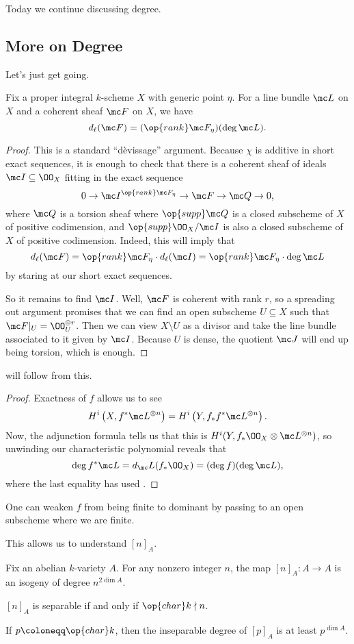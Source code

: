 \documentclass[../notes.tex]{subfiles}
\begin{document}
Today we continue discussing degree.

\subsection{More on Degree}
Let's just get going.
\begin{lemma} \label{lem:deg-by-rank}
	Fix a proper integral $k$-scheme $X$ with generic point $\eta$. For a line bundle $\mc L$ on $X$ and a coherent sheaf $\mc F$ on $X$, we have
	\[d_\ell(\mc F)=(\op{rank}\mc F_\eta)(\deg\mc L).\]
\end{lemma}
\begin{proof}
	This is a standard ``d\`evissage'' argument. Because $\chi$ is additive in short exact sequences, it is enough to check that there is a coherent sheaf of ideals $\mc I\subseteq\OO_X$ fitting in the exact sequence
	\[0\to\mc I^{\op{rank}\mc F_\eta}\to\mc F\to\mc Q\to0,\]
	where $\mc Q$ is a torsion sheaf where $\op{supp}\mc Q$ is a closed subscheme of $X$ of positive codimension, and $\op{supp}\OO_X/\mc I$ is also a closed subscheme of $X$ of positive codimension. Indeed, this will imply that
	\[d_\ell(\mc F)=\op{rank}\mc F_\eta\cdot d_\ell(\mc I)=\op{rank}\mc F_\eta\cdot\deg\mc L\]
	by staring at our short exact sequences.

	So it remains to find $\mc I$. Well, $\mc F$ is coherent with rank $r$, so a spreading out argument promises that we can find an open subscheme $U\subseteq X$ such that $\mc F|_U=\OO_U^{\oplus r}$. Then we can view $X\setminus U$ as a divisor and take the line bundle associated to it given by $\mc I$. Because $U$ is dense, the quotient $\mc J$ will end up being torsion, which is enough.
\end{proof}
 will follow from this.
\degpullback*
\begin{proof}
	Exactness of $f$ allows us to see
	\[H^i\left(X,f^*\mc L^{\otimes n}\right)=H^i\left(Y,f_*f^*\mc L^{\otimes n}\right).\]
	Now, the adjunction formula tells us that this is $H^i(Y,f_*\OO_X\otimes\mc L^{\otimes n})$, so unwinding our characteristic polynomial reveals that
	\[\deg f^*\mc L=d_\mc L(f_*\OO_X)=(\deg f)(\deg\mc L),\]
	where the last equality has used .
\end{proof}
\begin{remark}
	One can weaken $f$ from being finite to dominant by passing to an open subscheme where we are finite.
\end{remark}
This allows us to understand $[n]_A$.
\begin{theorem} \label{thm:mul-n-av}
	Fix an abelian $k$-variety $A$. For any nonzero integer $n$, the map $[n]_A\colon A\to A$ is an isogeny of degree $n^{2\dim A}$.
	\begin{listalph}
		\item $[n]_A$ is separable if and only if $\op{char}k\nmid n$.
		\item If $p\coloneqq\op{char}k$, then the inseparable degree of $[p]_A$ is at least $p^{\dim A}$.
	\end{listalph}
\end{theorem}
\end{document}
